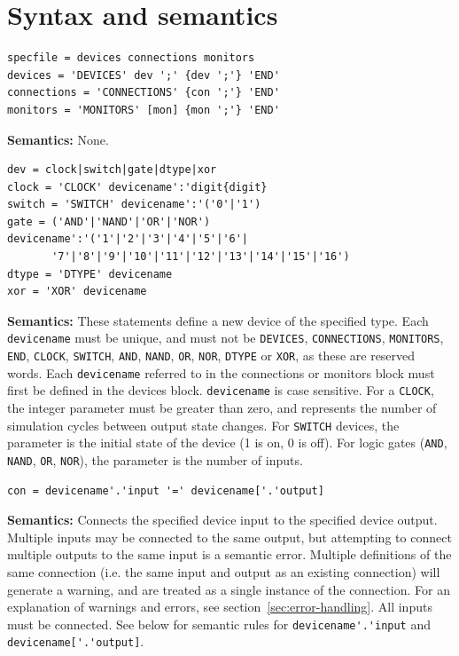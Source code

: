 \documentclass[a4paper,10pt]{article}
\begin{document}
\section{Syntax and semantics}

\begin{verbatim}
specfile = devices connections monitors
devices = 'DEVICES' dev ';' {dev ';'} 'END'
connections = 'CONNECTIONS' {con ';'} 'END' 
monitors = 'MONITORS' [mon] {mon ';'} 'END'
\end{verbatim} 

\textbf{Semantics:} None.

\begin{verbatim}
dev = clock|switch|gate|dtype|xor
clock = 'CLOCK' devicename':'digit{digit}
switch = 'SWITCH' devicename':'('0'|'1')
gate = ('AND'|'NAND'|'OR'|'NOR') devicename':'('1'|'2'|'3'|'4'|'5'|'6'|
       '7'|'8'|'9'|'10'|'11'|'12'|'13'|'14'|'15'|'16')
dtype = 'DTYPE' devicename
xor = 'XOR' devicename
\end{verbatim} 

\textbf{Semantics:} These statements define a new device of the specified type. Each \texttt{devicename} must be unique, and must not be \texttt{DEVICES}, \texttt{CONNECTIONS}, \texttt{MONITORS}, \texttt{END}, \texttt{CLOCK}, \texttt{SWITCH}, \texttt{AND}, \texttt{NAND}, \texttt{OR}, \texttt{NOR}, \texttt{DTYPE} or \texttt{XOR}, as these are reserved words.
Each \texttt{devicename} referred to in the connections or monitors block must first be defined in the devices block. \texttt{devicename} is case sensitive. For a \texttt{CLOCK}, the integer parameter must be greater than zero, and represents the number of simulation cycles between output state changes. For \texttt{SWITCH} devices, the parameter is the initial state of the device (1 is on, 0 is off).
For logic gates (\texttt{AND}, \texttt{NAND}, \texttt{OR}, \texttt{NOR}), the parameter is the number of inputs.

\begin{verbatim}
con = devicename'.'input '=' devicename['.'output]
\end{verbatim} 
\textbf{Semantics:} Connects the specified device input to the specified device output. Multiple inputs may be connected to the same output, but attempting to connect multiple outputs to the same input is a semantic error. Multiple definitions of the same connection (i.e. the same input and output as an existing connection) will generate a warning, and are treated as a single instance of the connection. For an explanation of warnings and errors, see section~\ref{sec:error-handling}. All inputs must be connected. See below for semantic rules for \verb|devicename'.'input| and \verb|devicename['.'output]|.
\end{document}
